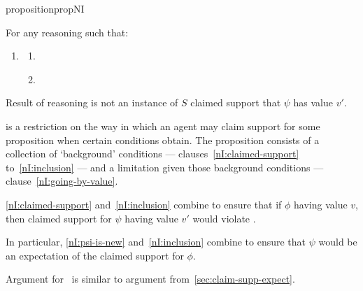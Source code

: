 \begin{note}[\nI{}]
\begin{restatable}[\nI{-}  --- \nI{}]{proposition}{propNI}
\begin{enumerate}[ref=\named{\nIacro{}:\arabic*}, resume*=nI_counter]
\begin{enumerate}[label=\alph*., ref=\named{\nIacro{}2:\alph*}]
      \end{enumerate}
    \end{enumerate}
    For any reasoning such that:
    \begin{enumerate}[ref=\named{\nIacro{}:\arabic*}, resume*=nI_counter]
    \item\label{nI:going-by-value} \nIClauseValue{}
      \begin{enumerate}[label=\alph*., ref=\named{\nIacro{}3:\alph*}]
      \item\label{nI:going-by-value:phi} \nIClauseValuePhi{}
      \item\label{nI:goingbyvalue:psi} \nIClauseValuePsi{}
      \end{enumerate}
    \end{enumerate}
    Result of reasoning is not an instance of \(S\) claimed support that \(\psi\) has value \(v'\).
    \vspace{-\baselineskip}
  \end{restatable}
\end{note}

\begin{note}
  \nI{} is a restriction on the way in which an agent may claim support for some proposition when certain conditions obtain.
  The proposition consists of a collection of `background' conditions --- clauses~\ref{nI:claimed-support} to~\ref{nI:inclusion} --- and a limitation given those background conditions --- clause~\ref{nI:going-by-value}.

  \ref{nI:claimed-support} and~\ref{nI:inclusion} combine to ensure that if \(\phi\) having value \(v\), then claimed support for \(\psi\) having value \(v'\) would violate \eiS{}.
  {
    \color{red} In particular, \ref{nI:psi-is-new} and~\ref{nI:inclusion} combine to ensure that \(\psi\) would be an expectation of the claimed support for \(\phi\).

    Argument for~\nI{} is similar to argument from~\ref{sec:claim-supp-expect}.
  }
\end{note}

